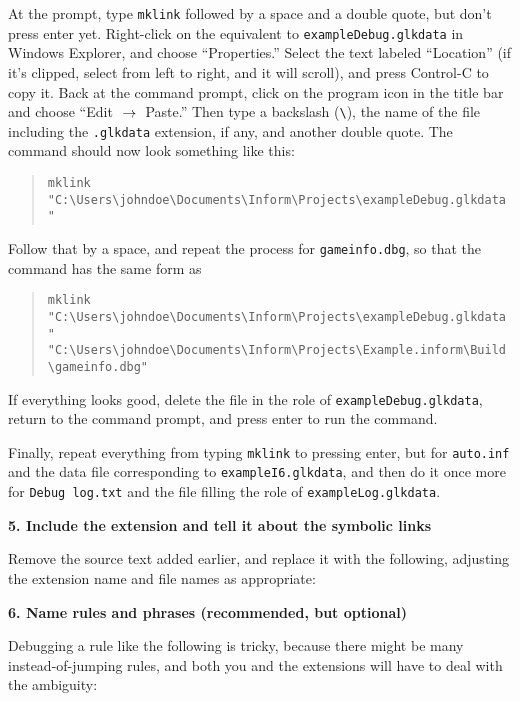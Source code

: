 \documentclass{book}
\newcommand{\nil}{{\null}}
\newcommand{\thento}{\(\nil\rightarrow\nil\)}
\begin{document}
At the prompt, type \texttt{mklink} followed by a space and a double quote, but
don't press enter yet.  Right-click on the equivalent to
\texttt{exampleDebug.glkdata} in Windows Explorer, and choose ``Properties.''
Select the text labeled ``Location'' (if it's clipped, select from left to
right, and it will scroll), and press Control-C to copy it.  Back at the command
prompt, click on the program icon in the title bar and choose ``Edit \thento
Paste.''  Then type a backslash (\lstinline @\@), the name of the file including
the \texttt{.glkdata} extension, if any, and another double quote.  The command
should now look something like this:

\begin{quote}
  \lstinline{mklink "C:\Users\johndoe\Documents\Inform\Projects\exampleDebug.glkdata"}
\end{quote}

Follow that by a space, and repeat the process for \texttt{gameinfo.dbg}, so
that the command has the same form as

\begin{quote}
  \lstinline{mklink "C:\Users\johndoe\Documents\Inform\Projects\exampleDebug.glkdata" "C:\Users\johndoe\Documents\Inform\Projects\Example.inform\Build\gameinfo.dbg"}
\end{quote}

If everything looks good, delete the file in the role of
\texttt{exampleDebug.glkdata}, return to the command prompt, and press enter to
run the command.

Finally, repeat everything from typing \texttt{mklink} to pressing enter, but
for \texttt{auto.inf} and the data file corresponding to
\texttt{exampleI6.glkdata}, and then do it once more for \texttt{Debug log.txt}
and the file filling the role of \texttt{exampleLog.glkdata}.

\textbf{5. Include the extension and tell it about the symbolic links}

Remove the source text added earlier, and replace it with the following,
adjusting the extension name and file names as appropriate:

\begin{quote}
  
\end{quote}

\textbf{6. Name rules and phrases (recommended, but optional)}

Debugging a rule like the following is tricky, because there might be many
instead-of-jumping rules, and both you and the extensions will have to deal with
the ambiguity:
\end{document}
